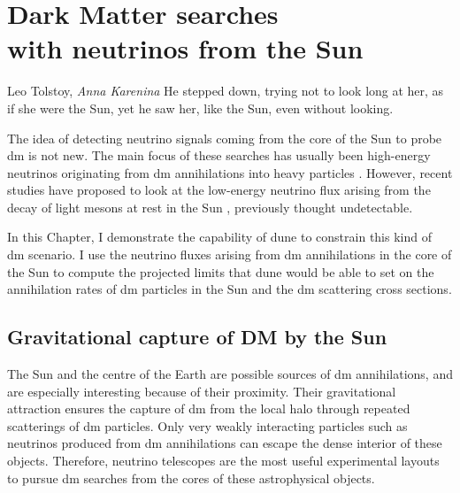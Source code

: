 \chapter[Dark Matter searches with neutrinos from the Sun]{Dark Matter searches\\ with neutrinos from the Sun}\label{chapter:dm_analysis}

\begin{chapquote}{Leo Tolstoy, \textit{Anna Karenina}}
	He stepped down, trying not to look long at her, as if she were the Sun, yet he saw her, like the Sun, even without looking.
\end{chapquote}

The idea of detecting neutrino signals coming from the core of the Sun to probe \gls{dm} is not new. The main focus of these searches has usually been high-energy neutrinos originating from \gls{dm} annihilations into heavy particles \cite{Silk1985, Srednicki1986, Hagelin1986, Gaisser1986}. However, recent studies have proposed to look at the low-energy neutrino flux arising from the decay of light mesons at rest in the Sun \cite{Bernal2012, Rott2012, Rott2015, DUNE2021}, previously thought undetectable.

%
In this Chapter, I demonstrate the capability of \gls{dune} to constrain this kind of \gls{dm} scenario. I use the neutrino fluxes arising from \gls{dm} annihilations in the core of the Sun to compute the projected limits that \gls{dune} would be able to set on the annihilation rates of \gls{dm} particles in the Sun and the \gls{dm} scattering cross sections.

\section{Gravitational capture of DM by the Sun}
\label{sec:dm_analysis_theory}

The Sun and the centre of the Earth are possible sources of \gls{dm} annihilations, and are especially interesting because of their proximity. Their gravitational attraction ensures the capture of \gls{dm} from the local halo through repeated scatterings of \gls{dm} particles. Only very weakly interacting particles such as neutrinos produced from \gls{dm} annihilations can escape the dense interior of these objects. Therefore, neutrino telescopes are the most useful experimental layouts to pursue \gls{dm} searches from the cores of these astrophysical objects.

